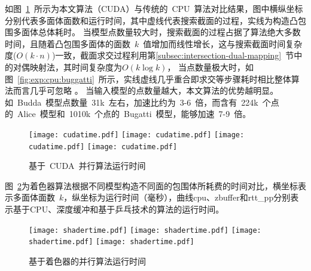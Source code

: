 如图~\ref{fig:chart:exps:cputime}~所示为本文算法（CUDA）与传统的~CPU~算法对比结果，图中横纵坐标分别代表多面体面数和运行时间，其中虚线代表搜索截面的过程，实线为构造凸包围多面体总体耗时。
当模型点数量较大时，搜索截面的过程占据了算法绝大多数时间，且随着凸包围多面体的面数~$k$~值增加而线性增长，这与搜索截面时间复杂度($O(k\cdot
n)$)一致，截面求交过程利用第\ref{subsec:intersection-dual-mapping}~节中的对偶映射法，其时间复杂度为$O(k\log k)$，
当点数量极大时，如图~\ref{fig:exp:cpu:buggatti}~所示，实线虚线几乎重合即求交等步骤耗时相比整体算法而言几乎可忽略
。
当输入模型的点数量越大，本文算法的优势越明显。如~Budda~模型点数量~31k~左右，加速比约为~3-6~倍，而含有~224k~个点的~Alice~模型和~1010k~个点的~Bugatti~模型，能够加速~7-9~倍。

\begin{figure}[htbp] %
\centering
{  
   \texttt{[image: cudatime.pdf]}
}
{  
    \texttt{[image: cudatime.pdf]}
}\linebreak %
{  
   \texttt{[image: cudatime.pdf]}
}
{  
   \texttt{[image: cudatime.pdf]}
}
\caption{基于~CUDA~并行算法运行时间}
\label{fig:chart:exps:cputime}
\end{figure}

图~\ref{fig:chart:exps:shadertime}为着色器算法根据不同模型构造不同面的包围体所耗费的时间对比，横坐标表示多面体面数~$k$，纵坐标为运行时间（毫秒），曲线cpu、zbuffer和rtt\_pp分别表示基于CPU、深度缓冲和基于乒乓技术的算法的运行时间。

\begin{figure}[htbp] %
\centering
{}
{  
   \texttt{[image: shadertime.pdf]}
}
{  
    \texttt{[image: shadertime.pdf]}
}\linebreak %
{  
   \texttt{[image: shadertime.pdf]}
}
{  
   \texttt{[image: shadertime.pdf]}
}
\caption{基于着色器的并行算法运行时间}
\label{fig:chart:exps:shadertime}
\end{figure}

